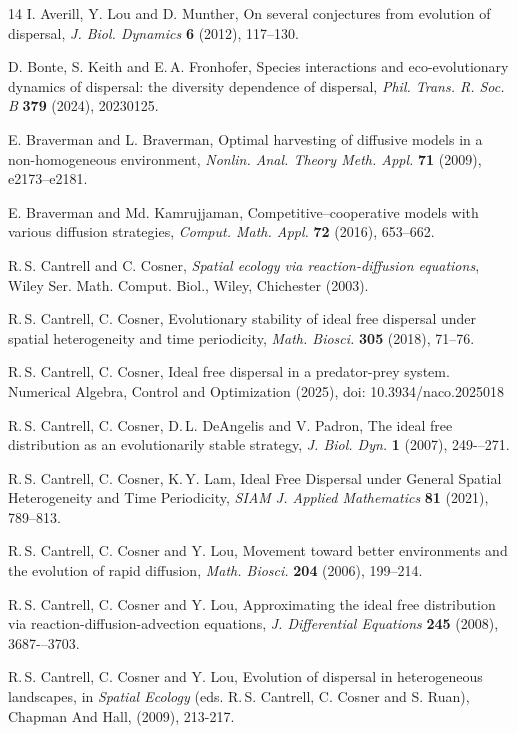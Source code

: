 \documentclass[11pt]{article}
\theoremstyle{definition}
\theoremstyle{remark}
\begin{document}
\begin{thebibliography}{14}
I. Averill, Y. Lou and D. Munther, On several conjectures from evolution of dispersal, 
{\em J. Biol. Dynamics} {\bf  6} (2012), 117--130.

D. Bonte, S. Keith and E.\,A. Fronhofer, Species interactions and eco-evolutionary dynamics of dispersal: the diversity dependence of dispersal, {\em Phil. Trans. R. Soc. B} {\bf 379} (2024), 20230125.

E. Braverman and L. Braverman,
Optimal harvesting of diffusive models in a non-homogeneous
environment, {\em Nonlin. Anal. Theory Meth. Appl.}
{\bf 71} (2009), e2173--e2181.

E. Braverman and Md. Kamrujjaman,
Competitive--cooperative models with various diffusion
strategies, {\em Comput. Math. Appl.} {\bf 72} (2016),
653--662.

R.\,S. Cantrell and C. Cosner, {\em Spatial ecology via reaction-diffusion equations}, Wiley Ser. Math. Comput. Biol., Wiley, Chichester (2003).

R.\,S. Cantrell, C. Cosner, Evolutionary stability of ideal free dispersal under spatial heterogeneity and time periodicity, {\em Math. Biosci.} {\bf 305} (2018), 71--76.

R.\,S. Cantrell, C. Cosner, 
Ideal free dispersal in a predator-prey system. Numerical Algebra, Control and Optimization (2025),
 doi: 10.3934/naco.2025018	

R.\,S. Cantrell, C. Cosner, D.\,L. DeAngelis and V. Padron, 
The ideal free distribution as an evolutionarily stable strategy,
{\em J. Biol. Dyn.} {\bf 1} (2007), %
249-–271.

R.\,S. Cantrell, C. Cosner, K.\,Y. Lam, Ideal Free Dispersal under General Spatial Heterogeneity and Time Periodicity, {\em SIAM J. Applied Mathematics} {\bf 81} (2021), 789--813.

R.\,S. Cantrell, C. Cosner and Y. Lou, 
Movement toward better environments
and the evolution of rapid diffusion,
{\em Math. Biosci.} {\bf 204} (2006), 199--214.

R.\,S. Cantrell, C. Cosner and Y. Lou, 
Approximating the ideal free distribution via reaction-diffusion-advection
equations, {\em J. Differential Equations} {\bf 245} (2008),
3687-–3703.

R.\,S. Cantrell, C. Cosner and Y. Lou, Evolution of dispersal in heterogeneous landscapes, in
{\em Spatial Ecology} (eds. R.\,S. Cantrell, C. Cosner and S. Ruan), Chapman And Hall, (2009),
213-217.


\end{thebibliography}
\end{document}
